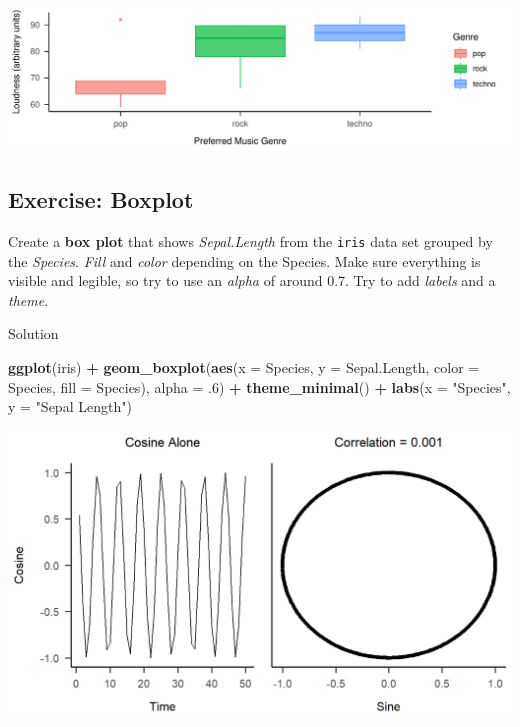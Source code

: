 \documentclass[
]{book}
\newenvironment{Shaded}{\begin{snugshade}}{\end{snugshade}}
\newcommand{\AttributeTok}[1]{\textcolor[rgb]{0.13,0.29,0.53}{#1}}
\newcommand{\DecValTok}[1]{\textcolor[rgb]{0.00,0.00,0.81}{#1}}
\newcommand{\FunctionTok}[1]{\textcolor[rgb]{0.13,0.29,0.53}{\textbf{#1}}}
\newcommand{\NormalTok}[1]{#1}
\newcommand{\SpecialCharTok}[1]{\textcolor[rgb]{0.81,0.36,0.00}{\textbf{#1}}}
\newcommand{\StringTok}[1]{\textcolor[rgb]{0.31,0.60,0.02}{#1}}
\begin{document}
\includegraphics{_main_files/figure-html/unnamed-chunk-40-1.pdf}

\subsection{Exercise: Boxplot}\label{exercise-boxplot}

Create a \textbf{box plot} that shows \emph{Sepal.Length} from the \texttt{iris} data set grouped by the \emph{Species}.
\emph{Fill} and \emph{color} depending on the Species.
Make sure everything is visible and legible, so try to use an \emph{alpha} of around 0.7.
Try to add \emph{labels} and a \emph{theme}.

Solution

\begin{Shaded}
\begin{Highlighting}[]
\FunctionTok{ggplot}\NormalTok{(iris) }\SpecialCharTok{+} 
  \FunctionTok{geom\_boxplot}\NormalTok{(}\FunctionTok{aes}\NormalTok{(}\AttributeTok{x =}\NormalTok{ Species, }\AttributeTok{y =}\NormalTok{ Sepal.Length,}
                   \AttributeTok{color =}\NormalTok{ Species, }\AttributeTok{fill =}\NormalTok{ Species), }\AttributeTok{alpha =}\NormalTok{ .}\DecValTok{6}\NormalTok{) }\SpecialCharTok{+}
  \FunctionTok{theme\_minimal}\NormalTok{() }\SpecialCharTok{+} \FunctionTok{labs}\NormalTok{(}\AttributeTok{x =} \StringTok{"Species"}\NormalTok{, }\AttributeTok{y =} \StringTok{"Sepal Length"}\NormalTok{)}
\end{Highlighting}
\end{Shaded}

\begin{flushleft}\includegraphics{_main_files/figure-html/unnamed-chunk-41-1} \end{flushleft}
\end{document}
